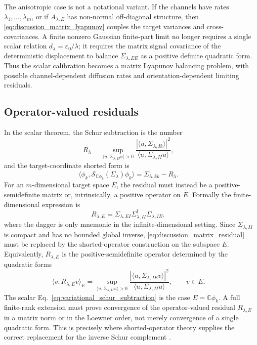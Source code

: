\documentclass[11pt]{amsart}
\theoremstyle{plain}
\theoremstyle{definition}
\theoremstyle{remark}
\begin{document}
The anisotropic case is not a notational variant.  If the channels have rates $\lambda_1,\ldots,\lambda_m$, or if $A_{\lambda,E}$ has non-normal off-diagonal structure, then \eqref{eq:discussion_matrix_lyapunov} couples the target variances and cross-covariances.  A finite nonzero Gaussian finite-part limit no longer requires a single scalar relation $d_\lambda=\varepsilon_0/\lambda$; it requires the matrix signal covariance of the deterministic displacement to balance $\Sigma_{\lambda,EE}$ as a positive definite quadratic form.  Thus the scalar calibration becomes a matrix Lyapunov balancing problem, with possible channel-dependent diffusion rates and orientation-dependent limiting residuals.

\subsection{Operator-valued residuals}
\label{sec:discussion:operator-valued-residuals}

In the scalar theorem, the Schur subtraction is the number
\[
  R_\lambda
  =\sup_{\langle u,\Sigma_{\lambda,II}u\rangle>0}
  \frac{|\langle u,\Sigma_{\lambda,Ik}\rangle|^2}
       {\langle u,\Sigma_{\lambda,II}u\rangle},
\]
and the target-coordinate shorted form is
\[
  \langle \phi_k,\mathcal S_{\mathbb C\phi_k}(\Sigma_\lambda)\phi_k\rangle
  =\Sigma_{\lambda,kk}-R_\lambda.
\]
For an $m$-dimensional target space $E$, the residual must instead be a positive-semidefinite matrix or, intrinsically, a positive operator on $E$.  Formally the finite-dimensional expression is
\begin{equation}
  \label{eq:discussion_matrix_residual}
  R_{\lambda,E}
  =\Sigma_{\lambda,EI}\Sigma_{\lambda,II}^{\dagger}\Sigma_{\lambda,IE},
\end{equation}
where the dagger is only mnemonic in the infinite-dimensional setting.  Since $\Sigma_{\lambda,II}$ is compact and has no bounded global inverse, \eqref{eq:discussion_matrix_residual} must be replaced by the shorted-operator construction on the subspace $E$.  Equivalently, $R_{\lambda,E}$ is the positive-semidefinite operator determined by the quadratic forms
\begin{equation}
  \label{eq:discussion_operator_residual_form}
  \langle v,R_{\lambda,E}v\rangle_E
  =
  \sup_{\langle u,\Sigma_{\lambda,II}u\rangle>0}
  \frac{|\langle u,\Sigma_{\lambda,IE}v\rangle|^2}
       {\langle u,\Sigma_{\lambda,II}u\rangle},
  \qquad v\in E.
\end{equation}
The scalar Eq.~\eqref{eq:variational_schur_subtraction} is the case $E=\mathbb C\phi_k$.  A full finite-rank extension must prove convergence of the operator-valued residual $R_{\lambda,E}$ in a matrix norm or in the Loewner order, not merely convergence of a single quadratic form.  This is precisely where shorted-operator theory supplies the correct replacement for the inverse Schur complement \cite{krein1947selfadjoint,anderson1975shorted,owhadi2015conditioning}.
\end{document}
